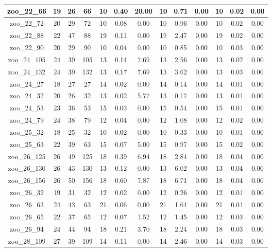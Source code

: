 \begin{landscape}
\begin{longtable}{|c|c|c|c|c|c|c|c|c|c|c|c|c|}
zoo\_22\_66 & 19 & 26 & 66 & 10 & 0.40 & 20.00 & 10 & 0.71 & 0.00 & 10 & 0.02 & 0.00 \\ \hline 
zoo\_22\_72 & 20 & 29 & 72 & 10 & 0.08 & 0.00 & 10 & 0.96 & 0.00 & 10 & 0.02 & 0.00 \\ \hline 
zoo\_22\_88 & 22 & 47 & 88 & 19 & 0.11 & 0.00 & 19 & 2.47 & 0.00 & 19 & 0.02 & 0.00 \\ \hline 
zoo\_22\_90 & 20 & 29 & 90 & 10 & 0.04 & 0.00 & 10 & 0.85 & 0.00 & 10 & 0.03 & 0.00 \\ \hline 
zoo\_24\_105 & 24 & 39 & 105 & 13 & 0.14 & 7.69 & 13 & 2.56 & 0.00 & 13 & 0.02 & 0.00 \\ \hline 
zoo\_24\_132 & 24 & 39 & 132 & 13 & 0.17 & 7.69 & 13 & 3.62 & 0.00 & 13 & 0.03 & 0.00 \\ \hline 
zoo\_24\_27 & 18 & 27 & 27 & 14 & 0.02 & 0.00 & 14 & 0.14 & 0.00 & 14 & 0.01 & 0.00 \\ \hline 
zoo\_24\_32 & 20 & 26 & 32 & 13 & 0.02 & 5.77 & 13 & 0.17 & 0.00 & 13 & 0.01 & 0.00 \\ \hline 
zoo\_24\_53 & 23 & 36 & 53 & 15 & 0.03 & 0.00 & 15 & 0.54 & 0.00 & 15 & 0.01 & 0.00 \\ \hline 
zoo\_24\_79 & 24 & 38 & 79 & 12 & 0.04 & 0.00 & 12 & 1.08 & 0.00 & 12 & 0.02 & 0.00 \\ \hline 
zoo\_25\_32 & 18 & 25 & 32 & 10 & 0.02 & 0.00 & 10 & 0.33 & 0.00 & 10 & 0.01 & 0.00 \\ \hline 
zoo\_25\_63 & 22 & 39 & 63 & 15 & 0.07 & 5.00 & 15 & 0.97 & 0.00 & 15 & 0.02 & 0.00 \\ \hline 
zoo\_26\_125 & 26 & 49 & 125 & 18 & 0.39 & 6.94 & 18 & 2.84 & 0.00 & 18 & 0.04 & 0.00 \\ \hline 
zoo\_26\_130 & 26 & 43 & 130 & 13 & 0.12 & 0.00 & 13 & 6.02 & 0.00 & 13 & 0.04 & 0.00 \\ \hline 
zoo\_26\_156 & 26 & 50 & 156 & 18 & 0.60 & 7.87 & 18 & 6.71 & 0.00 & 18 & 0.04 & 0.00 \\ \hline 
zoo\_26\_32 & 19 & 31 & 32 & 12 & 0.02 & 0.00 & 12 & 0.26 & 0.00 & 12 & 0.01 & 0.00 \\ \hline 
zoo\_26\_63 & 24 & 43 & 63 & 21 & 0.06 & 0.00 & 21 & 1.64 & 0.00 & 21 & 0.01 & 0.00 \\ \hline 
zoo\_26\_65 & 22 & 37 & 65 & 12 & 0.07 & 1.52 & 12 & 1.45 & 0.00 & 12 & 0.03 & 0.00 \\ \hline 
zoo\_26\_94 & 24 & 44 & 94 & 18 & 0.21 & 3.70 & 18 & 2.24 & 0.00 & 18 & 0.03 & 0.00 \\ \hline 
zoo\_28\_109 & 27 & 39 & 109 & 14 & 0.11 & 0.00 & 14 & 2.46 & 0.00 & 14 & 0.03 & 0.00 \\ \hline 

\end{longtable}
\end{landscape}
